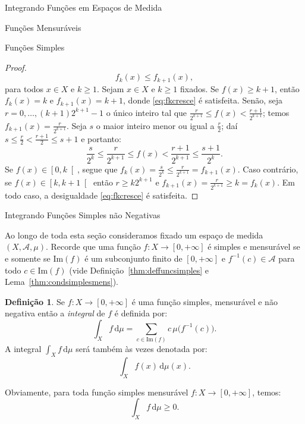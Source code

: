 \documentclass[oneside,final,11pt]{amsbook}
\newcommand{\Img}{\mathrm{Im}}
\newcommand{\dd}{\mathrm d}
\theoremstyle{remark}\newtheorem{exercise}{Exercício}[chapter]
\theoremstyle{remark}\newtheorem{*exercise}[exercise]{\hbox to 0pt{\hskip 0pt minus 1fil*}Exercício}
\theoremstyle{definition}\newtheorem{exdefin}{Definição}[chapter]
\theoremstyle{plain}\newtheorem{teo}{Teorema}[section]
\theoremstyle{plain}\newtheorem{lem}[teo]{Lema}
\theoremstyle{plain}\newtheorem{prop}[teo]{Proposição}
\theoremstyle{plain}\newtheorem{cor}[teo]{Corolário}
\theoremstyle{definition}\newtheorem{defin}[teo]{Definição}
\theoremstyle{remark}\newtheorem{rem}[teo]{Observação}
\theoremstyle{definition}\newtheorem{notation}[teo]{Notação}
\theoremstyle{definition}\newtheorem{convention}[teo]{Convenção}
\theoremstyle{definition}\newtheorem{example}[teo]{Exemplo}
\numberwithin{section}{chapter}
\numberwithin{equation}{section}
\begin{document}
\begin{chapter}{Integrando Funções em Espaços de Medida}
\begin{section}{Funções Mensuráveis}
\begin{subsection}{Funções Simples}
\begin{proof}
\begin{equation}
f_k(x)\le f_{k+1}(x),
\end{equation}
para todos $x\in X$ e $k\ge1$. Sejam $x\in X$ e $k\ge1$ fixados.
Se $f(x)\ge k+1$, então $f_k(x)=k$ e $f_{k+1}(x)=k+1$, donde \eqref{eq:fkcresce} é satisfeita.
Senão, seja $r=0,\ldots,(k+1)2^{k+1}-1$
o único inteiro tal que $\frac r{2^{k+1}}\le f(x)<\frac{r+1}{2^{k+1}}$; temos
$f_{k+1}(x)=\frac r{2^{k+1}}$. Seja $s$ o maior inteiro menor ou igual a $\frac r2$;
daí $s\le\frac r2<\frac{r+1}2\le s+1$ e portanto:
\[\frac s{2^k}\le\frac r{2^{k+1}}\le f(x)<\frac{r+1}{2^{k+1}}\le\frac{s+1}{2^k}.\]
Se $f(x)\in\left[0,k\right[$, segue que $f_k(x)=\frac s{2^k}\le\frac r{2^{k+1}}=f_{k+1}(x)$.
Caso contrário, se $f(x)\in\left[k,k+1\right[$ então $r\ge k2^{k+1}$ e
$f_{k+1}(x)=\frac r{2^{k+1}}\ge k=f_k(x)$. Em todo caso, a desigualdade \eqref{eq:fkcresce}
é satisfeita.
\end{proof}

\end{subsection}

\end{section}

\begin{section}{Integrando Funções Simples não Negativas}

Ao longo de toda esta seção consideramos fixado um espaço de medida $(X,\mathcal A,\mu)$.
Recorde que uma função $f:X\to[0,+\infty]$ é simples e mensurável se e somente se
$\Img(f)$ é um subconjunto finito de $[0,+\infty]$ e $f^{-1}(c)\in\mathcal A$ para todo
$c\in\Img(f)$ (vide Definição~\ref{thm:deffuncsimples} e Lema~\ref{thm:condsimplesmens}).

\begin{defin}
Se $f:X\to[0,+\infty]$ é uma função
simples, mensurável e não negativa então a {\em integral\/}%
de $f$ é definida por:
\index[simbolos]{$\int_Xf\,\dd\mu$}\[\int_Xf\,\dd\mu=\!\!\!\sum_{c\in\Img(f)}\!\!c\,\mu\big(f^{-1}(c)\big).\]
A integral $\int_Xf\,\dd\mu$ será também às vezes denotada por:
\index[simbolos]{$\int_Xf(x)\,\dd\mu(x)$}\[\int_Xf(x)\,\dd\mu(x).\]
\end{defin}
Obviamente, para toda função simples mensurável $f:X\to[0,+\infty]$,
temos:
\[\int_Xf\,\dd\mu\ge0.\]


\end{section}
\end{chapter}
\end{document}
